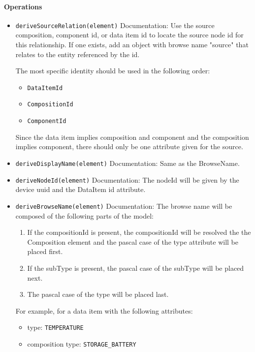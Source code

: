 \FloatBarrier



\paragraph{Operations}
\begin{itemize}
  \item \texttt{deriveSourceRelation(element)}
    Documentation: Use the source composition,  component id, or data item id to locate the source node id for this relationship. If one exists, add an object with  browse name "source" that relates to the entity referenced by the id. 

The most specific identity should be used in the following order:
\begin{itemize}
\item \texttt{DataItemId}
\item \texttt{CompositionId}
\item \texttt{ComponentId}
\end{itemize}

Since the data item implies composition and component and the composition implies component, there should only be one attribute given for the source.

  \item \texttt{deriveDisplayName(element)}
    Documentation: Same as the BrowseName.

  \item \texttt{deriveNodeId(element)}
    Documentation: The nodeId will be given by the device uuid and the DataItem id attribute.

  \item \texttt{deriveBrowseName(element)}
    Documentation: The browse name will be composed of the following parts of the model:

\begin{enumerate}
\item If the compositionId is present, the compositionId will be resolved the the Composition element and the pascal case of the type attribute will be placed first.
\item If the subType is present, the pascal case of the subType will be placed next.
\item The pascal case of the type will be placed last.
\end{enumerate}

For example, for a data item with the following attributes:

\begin{itemize}
\item type: \texttt{TEMPERATURE}
\item composition type: \texttt{STORAGE_BATTERY}
\end{itemize}


\end{itemize}
